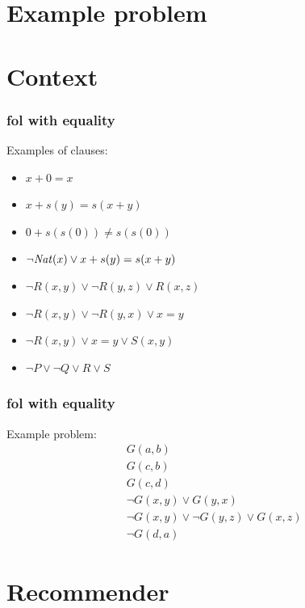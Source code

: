 \documentclass[a4paper]{beamer}
\author[F. Bártek]{Filip Bártek}
\title{\DissertationTitle}
\institute[\FacultyAndUniversityAbbr]{\University}
\date{\DTMdate{2022-03-23}}
\begin{document}
\begin{frame}
\titlepage
\end{frame}

\section{Example problem}



\section{Context}

\begin{frame}
\frametitle{\Gls{fol} with equality}
Examples of clauses:
\begin{itemize}
\item $x + 0 = x$
\item $x + s(y) = s(x + y)$
\item $0 + s(s(0)) \neq s(s(0))$
\item $\lnot \mathit{Nat}(x) \lor x + s(y) = s(x + y)$
\item $\lnot R(x, y) \lor \lnot R(y, z) \lor R(x, z)$
\item $\lnot R(x, y) \lor \lnot R(y, x) \lor x = y$
\item $\lnot R(x, y) \lor x = y \lor S(x, y)$
\item $\lnot P \lor \lnot Q \lor R \lor S$
\end{itemize}
\end{frame}

\begin{frame}
\frametitle{\Gls{fol} with equality}
Example problem:
\begin{align*}
&G(a, b)\\
&G(c, b)\\
&G(c, d)\\
&\lnot G(x, y) \lor G(y, x) \tag{symmetry}\\
&\lnot G(x, y) \lor \lnot G(y, z) \lor G(x, z) \tag{transitivity}\\
&\lnot G(d, a) \tag{negated conjecture}
\end{align*}
\end{frame}

\section{Recommender}
\end{document}
